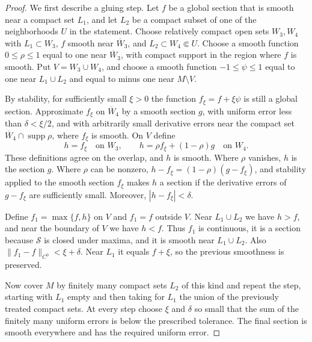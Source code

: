 \begin{proof}
We first describe a gluing step. Let $f$ be a global section that is smooth near a compact set $L_1$, and let $L_2$ be a compact subset of one of the neighborhoods $U$ in the statement. Choose relatively compact open sets $W_3,W_4$ with $L_1\subset W_3$, $f$ smooth near $\overline W_3$, and $L_2\subset W_4\Subset U$. Choose a smooth function $0\leq\rho\leq1$ equal to one near $\overline W_3$, with compact support in the region where $f$ is smooth. Put $V=W_3\cup W_4$, and choose a smooth function $-1\leq\psi\leq1$ equal to one near $L_1\cup L_2$ and equal to minus one near $M\setminus V$.

By stability, for sufficiently small $\xi>0$ the function $f_\xi=f+\xi\psi$ is still a global section. Approximate $f_\xi$ on $\overline W_4$ by a smooth section $g$, with uniform error less than $\delta<\xi/2$, and with arbitrarily small derivative errors near the compact set $\overline W_4\cap\operatorname{supp}\rho$, where $f_\xi$ is smooth. On $V$ define
\[
 h=f_\xi\quad\text{on }W_3,\qquad
 h=\rho f_\xi+(1-\rho)g\quad\text{on }W_4.
\]
These definitions agree on the overlap, and $h$ is smooth. Where $\rho$ vanishes, $h$ is the section $g$. Where $\rho$ can be nonzero, $h-f_\xi=(1-\rho)(g-f_\xi)$, and stability applied to the smooth section $f_\xi$ makes $h$ a section if the derivative errors of $g-f_\xi$ are sufficiently small. Moreover, $|h-f_\xi|<\delta$.

Define $f_1=\max\{f,h\}$ on $V$ and $f_1=f$ outside $V$. Near $L_1\cup L_2$ we have $h>f$, and near the boundary of $V$ we have $h<f$. Thus $f_1$ is continuous, it is a section because $\mathcal S$ is closed under maxima, and it is smooth near $L_1\cup L_2$. Also $\|f_1-f\|_{C^0}<\xi+\delta$. Near $L_1$ it equals $f+\xi$, so the previous smoothness is preserved.

Now cover $M$ by finitely many compact sets $L_2$ of this kind and repeat the step, starting with $L_1$ empty and then taking for $L_1$ the union of the previously treated compact sets. At every step choose $\xi$ and $\delta$ so small that the sum of the finitely many uniform errors is below the prescribed tolerance. The final section is smooth everywhere and has the required uniform error.
\end{proof}

